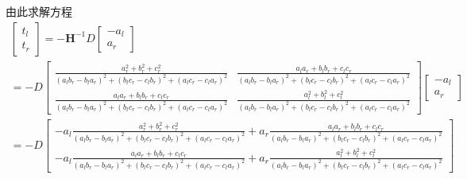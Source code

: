 由此求解方程
\begin{equation} 
\begin{gathered}
\left[ {\begin{array}{*{20}{c}}
	{{t_l}} \\ 
	{{t_r}} 
	\end{array}} \right] =  - {{\mathbf{H}}^{ - 1}}D\left[ {\begin{array}{*{20}{c}}
	{ - {a_l}} \\ 
	{{a_r}} 
	\end{array}} \right] \\ 
=  - D\left[ {\begin{array}{*{20}{c}}
	{\frac{{a_r^2 + b_r^2 + c_r^2}}{{{{\left( {{a_l}{b_r} - {b_l}{a_r}} \right)}^2} + {{\left( {{b_l}{c_r} - {c_l}{b_r}} \right)}^2} + {{\left( {{a_l}{c_r} - {c_l}{a_r}} \right)}^2}}}}&{\frac{{{a_l}{a_r} + {b_l}{b_r} + {c_l}{c_r}}}{{{{\left( {{a_l}{b_r} - {b_l}{a_r}} \right)}^2} + {{\left( {{b_l}{c_r} - {c_l}{b_r}} \right)}^2} + {{\left( {{a_l}{c_r} - {c_l}{a_r}} \right)}^2}}}} \\ 
	{\frac{{{a_l}{a_r} + {b_l}{b_r} + {c_l}{c_r}}}{{{{\left( {{a_l}{b_r} - {b_l}{a_r}} \right)}^2} + {{\left( {{b_l}{c_r} - {c_l}{b_r}} \right)}^2} + {{\left( {{a_l}{c_r} - {c_l}{a_r}} \right)}^2}}}}&{\frac{{a_l^2 + b_l^2 + c_l^2}}{{{{\left( {{a_l}{b_r} - {b_l}{a_r}} \right)}^2} + {{\left( {{b_l}{c_r} - {c_l}{b_r}} \right)}^2} + {{\left( {{a_l}{c_r} - {c_l}{a_r}} \right)}^2}}}} 
	\end{array}} \right]\left[ {\begin{array}{*{20}{c}}
	{ - {a_l}} \\ 
	{{a_r}} 
	\end{array}} \right] \\ 
=  - D\left[ {\begin{array}{*{20}{c}}
	{ - {a_l}\frac{{a_r^2 + b_r^2 + c_r^2}}{{{{\left( {{a_l}{b_r} - {b_l}{a_r}} \right)}^2} + {{\left( {{b_l}{c_r} - {c_l}{b_r}} \right)}^2} + {{\left( {{a_l}{c_r} - {c_l}{a_r}} \right)}^2}}} + {a_r}\frac{{{a_l}{a_r} + {b_l}{b_r} + {c_l}{c_r}}}{{{{\left( {{a_l}{b_r} - {b_l}{a_r}} \right)}^2} + {{\left( {{b_l}{c_r} - {c_l}{b_r}} \right)}^2} + {{\left( {{a_l}{c_r} - {c_l}{a_r}} \right)}^2}}}} \\ 
	{ - {a_l}\frac{{{a_l}{a_r} + {b_l}{b_r} + {c_l}{c_r}}}{{{{\left( {{a_l}{b_r} - {b_l}{a_r}} \right)}^2} + {{\left( {{b_l}{c_r} - {c_l}{b_r}} \right)}^2} + {{\left( {{a_l}{c_r} - {c_l}{a_r}} \right)}^2}}} + {a_r}\frac{{a_l^2 + b_l^2 + c_l^2}}{{{{\left( {{a_l}{b_r} - {b_l}{a_r}} \right)}^2} + {{\left( {{b_l}{c_r} - {c_l}{b_r}} \right)}^2} + {{\left( {{a_l}{c_r} - {c_l}{a_r}} \right)}^2}}}} 
	\end{array}} \right] \\ 
\end{gathered}
\end{equation}
